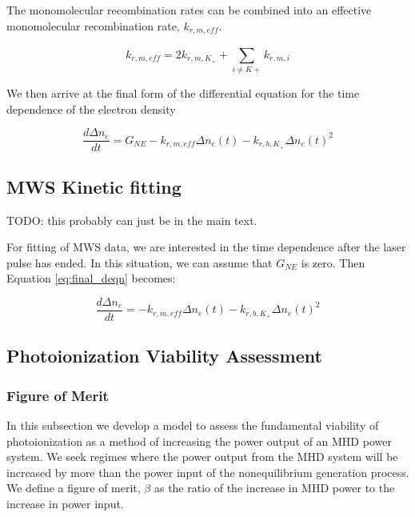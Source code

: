 The monomolecular recombination rates can be combined into an effective monomolecular recombination rate, $k_{r, m, eff}$. 

\begin{equation}
  k_{r, m, eff} = 2k_{r, m, K_{+}} + \sum_{i \neq K+}^{}k_{r, m, i}
\end{equation}

We then arrive at the final form of the differential equation for the time dependence of the electron density

\begin{equation}
  \label{eq:final_deqn}
\frac{d\Delta n_{e}}{dt} = G_{NE}   -   k_{r, m, eff}\Delta n_{e}(t) - k_{r, b, K_{+}}\Delta n_{e}(t)^2
\end{equation}



\subsection{MWS Kinetic fitting}

TODO: this probably can just be in the main text. 

For fitting of MWS data, we are interested in the time dependence after the laser pulse has ended. In this situation, we can assume that $G_{NE}$ is zero. Then Equation \ref{eq:final_deqn} becomes: 

\begin{equation}
\frac{d\Delta n_{e}}{dt} =   -   k_{r, m, eff}\Delta n_{e}(t)  - k_{r, b, K_{+}}\Delta n_{e}(t)^2
\end{equation}




\subsection{Photoionization Viability Assessment}

\subsubsection{Figure of Merit}

In this subsection we develop a model to assess the fundamental viability of photoionization as a method of increasing the power output of an MHD power system. We seek regimes where the power output from the MHD system will be increased by more than the power input of the nonequilibrium generation process. We define a figure of merit, $\beta$ as the ratio of the increase in MHD power to the increase in power input.


